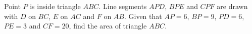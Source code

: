 Point $P$ is inside triangle $ABC$. Line segments $APD$, $BPE$ and $CPF$ are drawn with $D$ on $BC$, $E$ on $AC$ and $F$ on $AB$. Given that $AP=6$, $BP=9$, $PD=6$, $PE=3$ and $CF=20$, find the area of triangle $ABC$.
